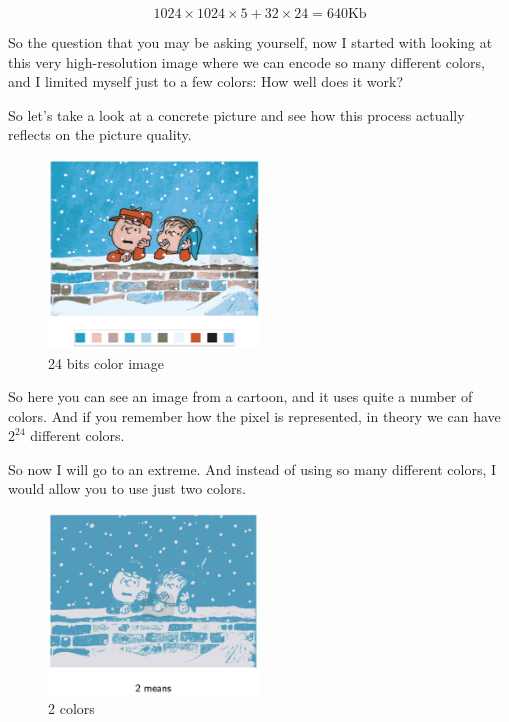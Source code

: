 \documentclass[a4paper, 12pt]{article}
\begin{document}
\begin{equation}
1024 \times 1024 \times 5 + 32 \times 24 = \text{640Kb}
 \end{equation}

So the question that you may be asking yourself, now I started with looking
at this very high-resolution image where we can encode so many different colors,
and I limited myself just to a few colors: How well does it work?

So let's take a look at a concrete picture and see how this process actually
reflects on the picture quality.

\begin{figure}[H]
\centering
\includegraphics[width=0.5\textwidth]{./pic/cartoon-01.png}
\caption{\label{fig:org14b1427}24 bits color image}
\end{figure}

So here you can see an image from a cartoon, and it uses quite a number of
colors. And if you remember how the pixel is represented, in theory we can have
\(2^{24}\) different colors.

So now I will go to an extreme. And instead of using so many different colors, I
would allow you to use just two colors.

\begin{figure}[H]
\centering
\includegraphics[width=0.5\textwidth]{./pic/cartoon-02.png}
\caption{\label{fig:org723004c}2 colors}
\end{figure}
\end{document}
